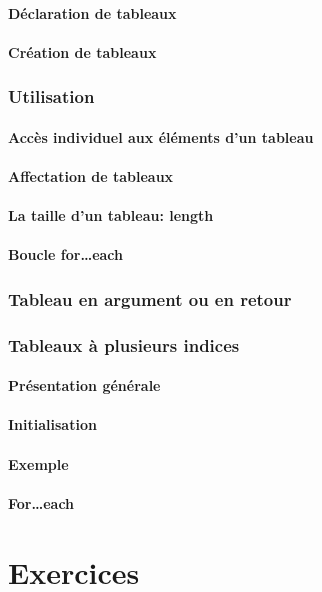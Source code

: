 \documentclass{beamer}
\begin{document}
        \subsection{Déclaration de tableaux}\label{subsec:declaration-de-tableaux}
            
        \subsection{Création de tableaux}\label{subsec:creation-de-tableaux}
            

    \section{Utilisation}
        \subsection{Accès individuel aux éléments d'un tableau}\label{subsec:acces-individuel-aux-elements-dun-tableau}
        \subsection{Affectation de tableaux}\label{subsec:affectation-de-tableaux}
        \subsection{La taille d'un tableau: length}\label{subsec:la-taille-dun-tableau}
        \subsection{Boucle for\ldots each}\label{subsec:boucle-foreach}

    \section{Tableau en argument ou en retour}\label{sec:tableau-en-argument-ou-en-retour}

    \section{Tableaux à plusieurs indices}\label{sec:tableaux-a-plusieurs-indices}
        \subsection{Présentation générale}\label{subsec:presentation-generale}
        \subsection{Initialisation}\label{subsec:initialisation}
        \subsection{Exemple}\label{subsec:exemple}
        \subsection{For\ldots each}\label{subsec:for-each}

    \part{Exercices}
\end{document}
